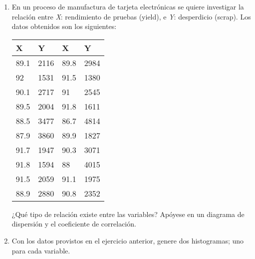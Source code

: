 \documentclass[12pt, oneside, a4paper, spanish]{article}
\begin{document}
\begin{enumerate}
	\item En un proceso de manufactura de tarjeta electrónicas se quiere investigar la relación entre \emph{X}: rendimiento de pruebas (yield), e \emph{Y}: desperdicio (scrap). Los datos obtenidos son los siguientes:
	
	\begin{table}[h]
		\centering
		\begin{tabular}{llll}
			\toprule
			X & Y & X& Y\\ 
			\midrule
			89.1&2116&89.8&2984\\
			92&1531&91.5&1380\\
			90.1&2717&91&2545\\
			89.5&2004&91.8&1611\\
			88.5&3477&86.7&4814\\
			87.9&3860&89.9&1827\\
			91.7&1947&90.3&3071\\
			91.8&1594&88&4015\\
			91.5&2059&91.1&1975\\
			88.9&2880&90.8&2352\\
			\bottomrule
		\end{tabular}
	\end{table}
¿Qué tipo de relación existe entre las variables? Apóyese en un diagrama de dispersión y el coeficiente de correlación.

\item Con los datos provistos en el ejercicio anterior, genere dos histogramas; uno para cada variable. 
\end{enumerate}
\end{document}
